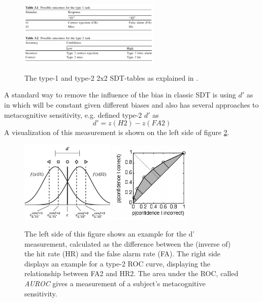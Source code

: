 \documentclass[../main/main.tex]{subfiles}
\begin{document}
	\begin{figure}[H]
		\centering
		\captionsetup{justification=centering}
		\includegraphics[width=0.6\textwidth]{../assets/type1_sdt_table.png}
		\includegraphics[width=0.6\textwidth]{../assets/type2_sdt_table.png}
		\caption{The type-1 and type-2 2x2 SDT-tables as explained in 						\citep{fleming2014measure}.} 
		\label{fig:tables}
	\end{figure}
	A standard way to remove the influence of the bias in classic SDT is using $d'$ as in \citep{green1966signal} which will be constant given different biases and also has several approaches to metacognitive sensitivity, e.g. \citep{kunimoto2001confidence} defined type-2 $d'$ as
	\begin{equation}
		d' = z(H2) - z(FA2)
	\end{equation}
	A visualization of this measurement is shown on the left side of figure \ref{fig:d_dash_and_roc}.
	\begin{figure}[H]
		\centering
		\captionsetup{justification=centering}
		\includegraphics[width=0.4\textwidth]{../assets/d_dash.png}
		\includegraphics[width=0.35\textwidth]{../assets/type1_roc.png}
		\caption{The left side of this figure shows an example for the d' measurement, calculated as the difference between the (inverse of) the hit rate (HR) and the false alarm rate (FA). The right side displays an example for a type-2 ROC curve, displaying the relationship between FA2 and HR2. The area under the ROC, called \textit{AUROC} gives a measurement of a subject's metacognitive sensitivity.} 
		\label{fig:d_dash_and_roc}
	\end{figure}
\end{document}
